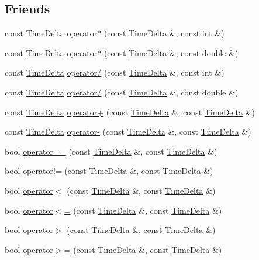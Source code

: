 \subsection*{\-Friends}
\begin{DoxyCompactItemize}
\item 
const \hyperlink{structTimeDelta}{\-Time\-Delta} \hyperlink{structTimeDelta_aef7928284f0439b514b32ca5617617b0}{operator$\ast$} (const \hyperlink{structTimeDelta}{\-Time\-Delta} \&, const int \&)
\item 
const \hyperlink{structTimeDelta}{\-Time\-Delta} \hyperlink{structTimeDelta_a00a2a0306b1e3547d02b905dccf2ff36}{operator$\ast$} (const \hyperlink{structTimeDelta}{\-Time\-Delta} \&, const double \&)
\item 
const \hyperlink{structTimeDelta}{\-Time\-Delta} \hyperlink{structTimeDelta_a3427dfdb6732015310d97872edbf97cb}{operator/} (const \hyperlink{structTimeDelta}{\-Time\-Delta} \&, const int \&)
\item 
const \hyperlink{structTimeDelta}{\-Time\-Delta} \hyperlink{structTimeDelta_a5f9b18fe821ce2448e044667f158e8fb}{operator/} (const \hyperlink{structTimeDelta}{\-Time\-Delta} \&, const double \&)
\item 
const \hyperlink{structTimeDelta}{\-Time\-Delta} \hyperlink{structTimeDelta_a4410e687a3a92f9a48c1d28ae61ee41a}{operator+} (const \hyperlink{structTimeDelta}{\-Time\-Delta} \&, const \hyperlink{structTimeDelta}{\-Time\-Delta} \&)
\item 
const \hyperlink{structTimeDelta}{\-Time\-Delta} \hyperlink{structTimeDelta_abb568533c9d0e4c9625faba58f3e129d}{operator-\/} (const \hyperlink{structTimeDelta}{\-Time\-Delta} \&, const \hyperlink{structTimeDelta}{\-Time\-Delta} \&)
\item 
bool \hyperlink{structTimeDelta_a9f553200840baea8eca578e7702bebb3}{operator==} (const \hyperlink{structTimeDelta}{\-Time\-Delta} \&, const \hyperlink{structTimeDelta}{\-Time\-Delta} \&)
\item 
bool \hyperlink{structTimeDelta_a5be2899748df249dff26a5c20f15fe3f}{operator!=} (const \hyperlink{structTimeDelta}{\-Time\-Delta} \&, const \hyperlink{structTimeDelta}{\-Time\-Delta} \&)
\item 
bool \hyperlink{structTimeDelta_a04aff1caeb09c0580d802803ad2e1a40}{operator$<$} (const \hyperlink{structTimeDelta}{\-Time\-Delta} \&, const \hyperlink{structTimeDelta}{\-Time\-Delta} \&)
\item 
bool \hyperlink{structTimeDelta_a676bbb918c9bb5a9ee2429116c204345}{operator$<$=} (const \hyperlink{structTimeDelta}{\-Time\-Delta} \&, const \hyperlink{structTimeDelta}{\-Time\-Delta} \&)
\item 
bool \hyperlink{structTimeDelta_a7c3491579f393a434bf5ef180fd0a83c}{operator$>$} (const \hyperlink{structTimeDelta}{\-Time\-Delta} \&, const \hyperlink{structTimeDelta}{\-Time\-Delta} \&)
\item 
bool \hyperlink{structTimeDelta_aa776c7c03929c0d67e2b207ea75e0819}{operator$>$=} (const \hyperlink{structTimeDelta}{\-Time\-Delta} \&, const \hyperlink{structTimeDelta}{\-Time\-Delta} \&)
\end{DoxyCompactItemize}


